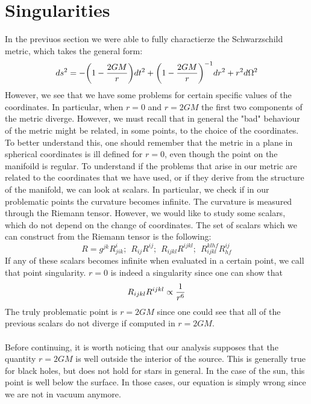\documentclass[]{article}
\theoremstyle{definition}
\theoremstyle{Theorem}
\theoremstyle{definition}
\theoremstyle{definition}
\theoremstyle{definition}
\begin{document}
\section{Singularities}
In the previuos section we were able to fully charactierze the Schwarzschild metric, which takes the general form:
$$ds^2=-\bigg(1-{2GM\over r}\bigg)dt^2+\bigg(1-{2GM\over r}\bigg)^{-1}dr^2+r^2d\Omega^2$$
However, we see that we have some problems for certain specific values of the coordinates. In particular, when $r=0$ and $r=2GM$ the first two components of the metric diverge. However, we must recall that in general the "bad" behaviour of the metric might be related, in some points, to the choice of the coordinates. To better understand this, one should remember that the metric in a plane in spherical coordinates is ill defined for $r=0$, even though the point on the manifoild is regular. To understand if the problems that arise in our metric are related to the coordinates that we have used, or if they derive from the structure of the manifold, we can look at scalars. In particular, we check if in our problematic points the curvature becomes infinite. The curvature is measured through the Riemann tensor. However, we would like to study some scalars, which do not depend on the change of coordinates. The set of scalars which we can construct from the Riemann tensor is the following:
$$R=g^{jk}R^i_{jik};\hspace{5pt}R_{ij}R^{ij};\hspace{5pt}R_{ijkl}R^{ijkl};\hspace{5pt}R_{ijkl}^{klhf}R_{hf}^{ij}$$ 
If any of these scalars becomes infinite when evaluated in a certain point, we call that point singularity.
$r=0$ is indeed a singularity since one can show that
$$R_{ijkl}R^{ijkl}\propto {1\over r^6}$$
The truly problematic point is $r=2GM$ since one could see that all of the previous scalars do not diverge if computed in $r=2GM$.\\
\\
Before continuing, it is worth noticing that our analysis supposes that the quantity $r=2GM$ is well outside the interior of the source. This is generally true for black holes, but does not hold for stars in general. In the case of the sun, this point is well below the surface. In those cases, our equation is simply wrong since we are not in vacuum anymore.
\end{document}
